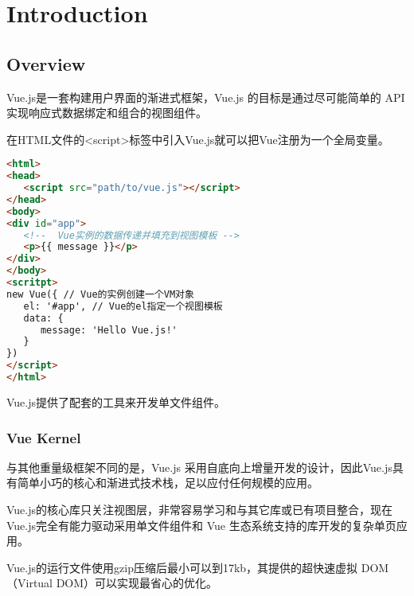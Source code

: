 \part{Introduction}


\chapter{Overview}

Vue.js是一套构建用户界面的渐进式框架，Vue.js 的目标是通过尽可能简单的 API 实现响应式数据绑定和组合的视图组件。

在HTML文件的<script>标签中引入Vue.js就可以把Vue注册为一个全局变量。



\begin{lstlisting}[language=HTML]
<html>
<head>
   <script src="path/to/vue.js"></script>
</head>
<body>
<div id="app">
   <!--  Vue实例的数据传递并填充到视图模板 -->
   <p>{{ message }}</p>
</div>
</body>
<scritpt>
new Vue({ // Vue的实例创建一个VM对象
   el: '#app', // Vue的el指定一个视图模板
   data: {
      message: 'Hello Vue.js!'
   }
})
</script>
</html>
\end{lstlisting}




Vue.js提供了配套的工具来开发单文件组件。



\section{Vue Kernel}

与其他重量级框架不同的是，Vue.js 采用自底向上增量开发的设计，因此Vue.js具有简单小巧的核心和渐进式技术栈，足以应付任何规模的应用。

Vue.js的核心库只关注视图层，非常容易学习和与其它库或已有项目整合，现在Vue.js完全有能力驱动采用单文件组件和 Vue 生态系统支持的库开发的复杂单页应用。

Vue.js的运行文件使用gzip压缩后最小可以到17kb，其提供的超快速虚拟 DOM（Virtual DOM）可以实现最省心的优化。

